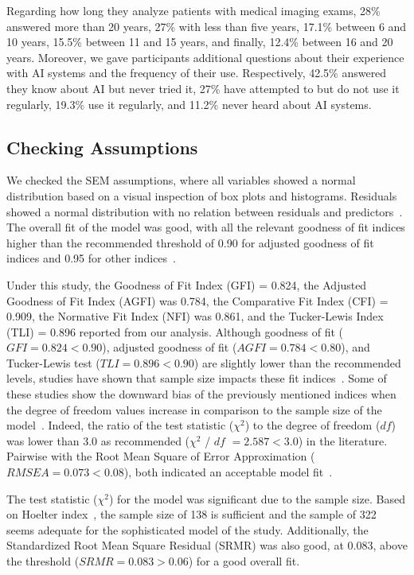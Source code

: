 Regarding how long they analyze patients with medical imaging exams, 28\% answered more than 20 years, 27\% with less than five years, 17.1\% between 6 and 10 years, 15.5\% between 11 and 15 years, and finally, 12.4\% between 16 and 20 years.
Moreover, we gave participants additional questions about their experience with AI systems and the frequency of their use.
Respectively, 42.5\% answered they know about AI but never tried it, 27\% have attempted to but do not use it regularly, 19.3\% use it regularly, and 11.2\% never heard about AI systems.

\subsection{Checking Assumptions}
\label{sec:chap004005001}

We checked the SEM assumptions, where all variables showed a normal distribution based on a visual inspection of box plots and histograms.
Residuals showed a normal distribution with no relation between residuals and predictors~\cite{murtagh2012multivariate}.
The overall fit of the model was good, with all the relevant goodness of fit indices higher than the recommended threshold of 0.90 for adjusted goodness of fit indices and 0.95 for other indices~\cite{Bagozzi2012, doi:10.1504/IJMDA.2017.087624, murtagh2012multivariate, SUMAK2016602}.

Under this study, the Goodness of Fit Index (GFI) = 0.824, the Adjusted Goodness of Fit Index (AGFI) was 0.784, the Comparative Fit Index (CFI) = 0.909, the Normative Fit Index (NFI) was 0.861, and the Tucker-Lewis Index (TLI) = 0.896 reported from our analysis.
Although goodness of fit ($GFI = 0.824 < 0.90$), adjusted goodness of fit ($AGFI = 0.784 < 0.80$), and Tucker-Lewis test ($TLI = 0.896 < 0.90$) are slightly lower than the recommended levels, studies have shown that sample size impacts these fit indices~\cite{KHALILZADEH2017460, doi:10.1080/00273171.2019.1602503, ZHOU2010760}.
Some of these studies show the downward bias of the previously mentioned indices when the degree of freedom values increase in comparison to the sample size of the model~\cite{doi:10.1080/00273171.2019.1602503}.
Indeed, the ratio of the test statistic ($\chi^2$) to the degree of freedom ($df$) was lower than 3.0 as recommended ($\chi^2$ / $df$ $= 2.587 < 3.0$) in the literature.
Pairwise with the Root Mean Square of Error Approximation ($RMSEA = 0.073 < 0.08$), both indicated an acceptable model fit~\cite{ZHOU2010760}.

The test statistic ($\chi^2$) for the model was significant due to the sample size.
Based on Hoelter index~\cite{https://doi.org/10.1002/nur.20088}, the sample size of 138 is sufficient and the sample of 322 seems adequate for the sophisticated model of the study.
Additionally, the Standardized Root Mean Square Residual (SRMR) was also good, at 0.083, above the threshold ($SRMR = 0.083 > 0.06$) for a good overall fit.

